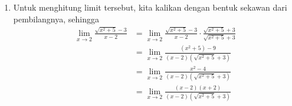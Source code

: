 \documentclass[11pt,openany,a4paper]{article}
\begin{document}
\begin{enumerate}
\begin{enumerate}
\begin{center}
                    \end{center}
          \end{enumerate}
    \item Untuk menghitung limit tersebut, kita kalikan dengan bentuk sekawan dari pembilangnya, sehingga
          \begin{align*}
              \lim_{x \to 2} \frac{\sqrt{x^2 + 5} - 3}{x - 2} & = \lim_{x \to 2} \frac{\sqrt{x^2 + 5} - 3}{x - 2} \cdot \frac{\sqrt{x^2 + 5} + 3}{\sqrt{x^2 + 5} + 3}                                                                                                                                                                                                                                                                          \\
                                                              & = \lim_{x \to 2} \frac{(x^2 + 5) - 9}{(x - 2)(\sqrt{x^2 + 5} + 3)}                                                                                                                                                                                                                                                                                                             \\
                                                              & = \lim_{x \to 2} \frac{x^2 - 4}{(x - 2)(\sqrt{x^2 + 5} + 3)}                                                                                                                                                                                                                                                                                                                   \\
                                                              & = \lim_{x \to 2} \frac{(x - 2)(x + 2)}{(x - 2)(\sqrt{x^2 + 5} + 3)}                                                                                                                                                                                                                                                                                                            \\

\end{align*}
\end{enumerate}
\end{document}
